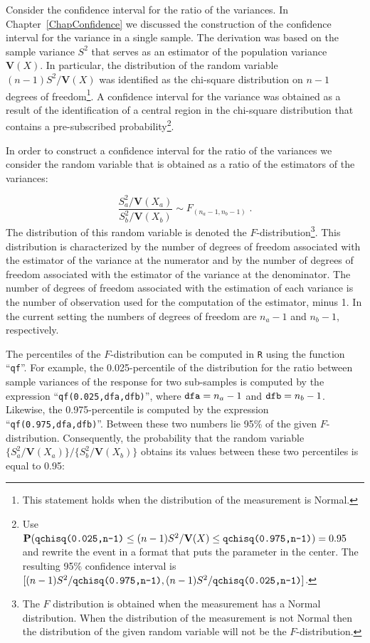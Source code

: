\documentclass[]{krantz}
\newcommand{\Prob}{\mathbf{P}}
\newcommand{\Var}{\mathbf{V}}
\theoremstyle{definition}
\theoremstyle{definition}
\theoremstyle{definition}
\theoremstyle{remark}
\begin{document}
Consider the confidence interval for the ratio of the variances. In
Chapter~\ref{ChapConfidence} we discussed the construction of the
confidence interval for the variance in a single sample. The derivation
was based on the sample variance \(S^2\) that serves as an estimator of
the population variance \(\Var(X)\). In particular, the distribution of
the random variable \((n-1)S^2/\Var(X)\) was identified as the chi-square
distribution on \(n-1\) degrees of freedom\footnote{This statement holds when the distribution of the measurement is
  Normal.}. A confidence interval for
the variance was obtained as a result of the identification of a central
region in the chi-square distribution that contains a pre-subscribed
probability\footnote{Use
  \(\Prob(\mbox{\texttt{qchisq(0.025,n-1)}} \leq (n-1)S^2/\Var(X) \leq \mbox{\texttt{qchisq(0.975,n-1)}}) = 0.95\)
  and rewrite the event in a format that puts the parameter in the
  center. The resulting 95\% confidence interval is
  \([(n-1)S^2/\mbox{\texttt{qchisq(0.975,n-1)}},(n-1)S^2/\mbox{\texttt{qchisq(0.025,n-1)}}]\).}.

In order to construct a confidence interval for the ratio of the
variances we consider the random variable that is obtained as a ratio of
the estimators of the variances:

\[\frac{S_a^2/\Var(X_a)}{S^2_b/\Var(X_b)} \sim F_{(n_a-1,n_b-1)}\;.\]
The distribution of this random variable is denoted the
\(F\)-distribution\footnote{The \(F\) distribution is obtained when the measurement has a Normal
  distribution. When the distribution of the measurement is not Normal
  then the distribution of the given random variable will not be the
  \(F\)-distribution.}. This distribution is characterized by the number
of degrees of freedom associated with the estimator of the variance at
the numerator and by the number of degrees of freedom associated with
the estimator of the variance at the denominator. The number of degrees
of freedom associated with the estimation of each variance is the number
of observation used for the computation of the estimator, minus 1. In
the current setting the numbers of degrees of freedom are \(n_a-1\) and
\(n_b-1\), respectively.

The percentiles of the \(F\)-distribution can be computed in \texttt{R} using the
function ``\texttt{qf}''. For example, the 0.025-percentile of the distribution
for the ratio between sample variances of the response for two
sub-samples is computed by the expression ``\texttt{qf(0.025,dfa,dfb)}'', where
\(\mbox{\texttt{dfa}} = n_a - 1\) and \(\mbox{\texttt{dfb}} = n_b - 1\).
Likewise, the 0.975-percentile is computed by the expression
``\texttt{qf(0.975,dfa,dfb)}''. Between these two numbers lie 95\% of the given
\(F\)-distribution. Consequently, the probability that the random variable
\(\{S_a^2/\Var(X_a)\}/\{S_b^2/\Var(X_b)\}\) obtains its values between
these two percentiles is equal to 0.95:
\end{document}
